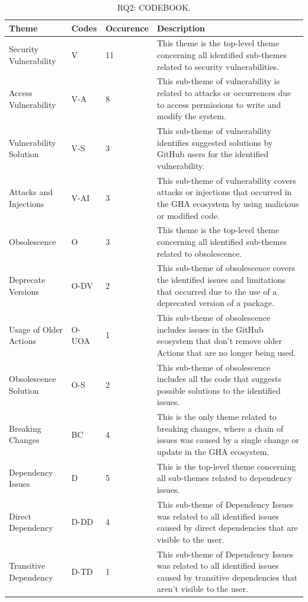 \documentclass[conference]{IEEEtran}
\begin{document}
\begin{table}[!t]
    \centering
    \caption{RQ2: CODEBOOK.}
    \label{tab:full-width}
    \hspace{0.5cm}
    \begin{tabular}{|p{3cm}|p{1cm}|p{1.5cm}|p{11cm}|}
        \hline
        \textbf{Theme} & \textbf{Codes}  & \textbf{Occurence}  & \textbf{Description} \\
        \hline
        Security Vulnerability & V & 11 & This theme is the top-level theme concerning all identified sub-themes related to security vulnerabilities. \\
        \hline
        Access Vulnerability & V-A & 8 & This sub-theme of vulnerability is related to attacks or occurrences due to access permissions to write and modify the system. \\
        \hline
        Vulnerability Solution & V-S & 3 & This sub-theme of vulnerability identifies suggested solutions by GitHub users for the identified vulnerability.\\
        \hline
        Attacks and Injections & V-AI & 3 & This sub-theme of vulnerability covers attacks or injections that occurred in the GHA ecosystem by using malicious or modified code. \\
        \hline
        Obsolescence & O & 3 & This theme is the top-level theme concerning all identified sub-themes related to obsolescence.\\
        \hline
        Deprecate Versions & O-DV & 2 & This sub-theme of obsolescence covers the identified issues and limitations that occurred due to the use of a deprecated version of a package. \\
        \hline
        Usage of Older Actions & O-UOA & 1& This sub-theme of obsolescence includes issues in the GitHub ecosystem that don't remove older Actions that are no longer being used. \\
        \hline
        Obsolescence Solution & O-S & 2 & This sub-theme of obsolescence includes all the code that suggests possible solutions to the identified issues. \\
        \hline
        Breaking Changes & BC & 4 & This is the only theme related to breaking changes, where a chain of issues was caused by a single change or update in the GHA ecosystem. \\
        \hline
        Dependency Issues & D & 5 & This is the top-level theme concerning all sub-themes related to dependency issues. \\	
        \hline
        Direct Dependency  & D-DD & 4 & This sub-theme of Dependency Issues was related to all identified issues caused by direct dependencies that are visible to the user. \\	
        \hline
        Transitive Dependency & D-TD & 1 & This sub-theme of Dependency Issues was related to all identified issues caused by transitive dependencies that aren’t visible to the user.\\	
        \hline
    \end{tabular}
\end{table}
\end{document}
